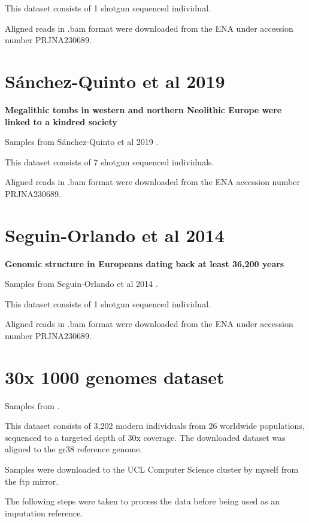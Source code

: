 This dataset consists of 1 shotgun sequenced individual.

Aligned reads in .bam format were downloaded from the ENA under accession number PRJNA230689.

\section{Sánchez-Quinto et al 2019}

\textbf{Megalithic tombs in western and northern Neolithic Europe were linked to a kindred society}

Samples from  Sánchez-Quinto et al 2019 \cite{sanchez2019megalithic}.

This dataset consists of 7 shotgun sequenced individuals.

Aligned reads in .bam format were downloaded from the ENA accession number PRJNA230689.

\section{Seguin-Orlando et al 2014}

\textbf{Genomic structure in Europeans dating back at least 36,200 years}

Samples from  Seguin-Orlando et al 2014 \cite{Seguin-Orlando2014}.

This dataset consists of 1 shotgun sequenced individual.

Aligned reads in .bam format were downloaded from the ENA under accession number PRJNA230689.


\section{30x 1000 genomes dataset}

Samples from \cite{byrska2021high}.

This dataset consists of 3,202 modern individuals from 26 worldwide populations, sequenced to a targeted depth of 30x coverage. The downloaded dataset was aligned to the gr38 reference genome.

Samples were downloaded to the UCL Computer Science cluster by myself from the ftp mirror.

The following steps were taken to process the data before being used as an imputation reference. 


